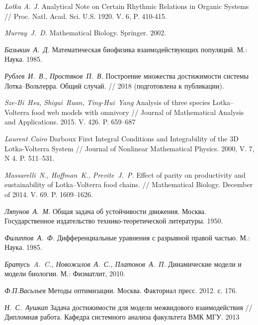 \documentclass[11pt]{article}
\theoremstyle{definition}
\begin{document}
\clearpage
\newpage
\begin{thebibliography}{0}

	 {\it Lotka A. J.} Analytical Note on Certain Rhythmic Relations in Organic Systems // Proc. Natl. Acad. Sci. U.S. 1920. V. 6, P. 410-415.
	
	 {\it Murray~J.~D.} Mathematical Biology. Springer. 2002.
	
	 {\it Базыкин~А.~Д.} Математическая биофизика взаимодействующих популяций. М.: Наука. 1985.
	
	 {\it Рублев~И.~В., Простяков~П.~В.} Построение множества достижимости системы Лотка--Вольтерра. Общий случай. // 2018 (подготовлена к публикации).
	
	 {\it Sze-Bi~Hsu, Shigui~Ruan, Ting-Hui~Yang} Analysis of three species Lotka–Volterra food web models with omnivory // Journal of Mathematical Analysis and Applications. 2015. V. 426. P. 659--687
	
	 {\it Laurent Cairo} Darboux First Integral Conditions and Integrability of the 3D Lotka-Volterra System // Journal of Nonlinear Mathematical Physics. 2000, V. 7, N 4. P. 511--531.
   
    	 {\it Massarelli~N., Hoffman~K., Previte~J.~P.} Effect of parity on productivity and sustainability of Lotka–Volterra food chains. // Mathematical Biology. December of 2014. V. 69. P. 1609--1626.
	
	 {\it Ляпунов~А.~М.} Общая задача об устойчивости движения. Москва. Государственное издательство технико-теоретической литературы. 1950.
    
    	 {\it Филиппов~А.~Ф.} Дифференциальные уравнения с разрывной правой частью. М.: Наука. 1985.
	   
    	 {\it Братусь~A.~C., Новожилов~А.~С., Платонов~А.~П.} Динамические модели и модели биологии. М.: Физматлит, 2010.
	 
	  {\it Ф.П.Васьльев} Методы оптимизации. Москва. Факториал пресс. 2012. с. 176.

	  {\it Н.~С.~Аушкап} Задача достижимости для модели межвидового взаимодействия // Дипломная работа. Кафедра системного анализа факультета ВМК МГУ. 2013
	 
\end{thebibliography}
   
\end{document}
